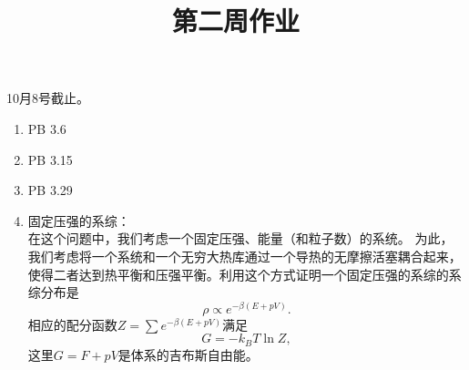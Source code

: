 \documentclass[12pt,aps,pra,notitlepage]{revtex4-1}
\begin{document}
\title{第二周作业}
\maketitle
\begin{center}
  10月8号截止。  
\end{center}
\begin{enumerate}
  \item PB 3.6
  \item PB 3.15
  \item PB 3.29
  \item 固定压强的系综：\\
  在这个问题中，我们考虑一个固定压强、能量（和粒子数）的系统。
  为此，我们考虑将一个系统和一个无穷大热库通过一个导热的无摩擦活塞耦合起来，使得二者达到热平衡和压强平衡。利用这个方式证明一个固定压强的系综的系综分布是
  \[\rho \propto e^{-\beta(E+pV)}.\]
  相应的配分函数$Z=\sum e^{-\beta(E+pV)}$满足
  \[G=-k_BT\ln Z,\]
  这里$G=F+pV$是体系的吉布斯自由能。
\end{enumerate}
\end{document}
